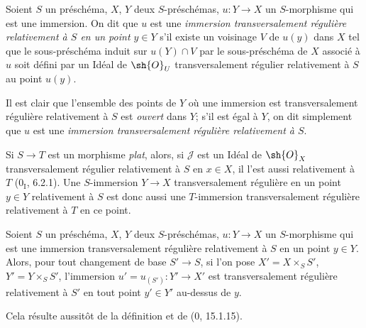 \begin{definition}[19.2.2]
Soient $S$ un préschéma, $X$, $Y$ deux $S$-préschémas, $u:Y\to X$ un $S$-morphisme qui est une immersion. On dit que $u$ est une \emph{immersion transversalement régulière relativement à $S$ en un point $y\in Y$} s'il existe un voisinage $V$ de $u(y)$ dans $X$ tel que le sous-préschéma induit sur $u(Y)\cap V$ par le sous-préschéma de $X$ associé à $u$ soit défini par un Idéal de $\sh{O}_U$ transversalement régulier relativement à $S$ au point $u(y)$.

Il est clair que l'ensemble des points de $Y$ où une immersion est transversalement régulière relativement à $S$ est \emph{ouvert} dans $Y$; s'il est égal à $Y$, on dit simplement que $u$ est une \emph{immersion transversalement régulière relativement à $S$}.

Si $S\to T$ est un morphisme \emph{plat}, alors, si $\mathscr J$ est un Idéal de $\sh{O}_X$ transversalement régulier relativement à $S$ en $x\in X$, il l'est aussi relativement à $T$ ($0_{\mathrm I}$, 6.2.1). Une $S$-immersion $Y\to X$ transversalement régulière en un point $y\in Y$ relativement à $S$ est donc aussi une $T$-immersion transversalement régulière relativement à $T$ en ce point.
\end{definition}

\begin{proposition}[19.2.3]
\label{IV.19.2.3}
Soient $S$ un préschéma, $X$, $Y$ deux $S$-préschémas, $u:Y\to X$ un $S$-morphisme qui est une immersion transversalement régulière relativement à $S$ en un point $y\in Y$. Alors, pour tout changement de base $S'\to S$, si l'on pose $X'=X\times_S S'$, $Y'=Y\times_S S'$, l'immersion $u'=u_{(S')}:Y'\to X'$ est transversalement régulière relativement à $S'$ en tout point $y'\in Y'$ au-dessus de $y$.
\end{proposition}

Cela résulte aussitôt de la définition et de ($0$, 15.1.15).

